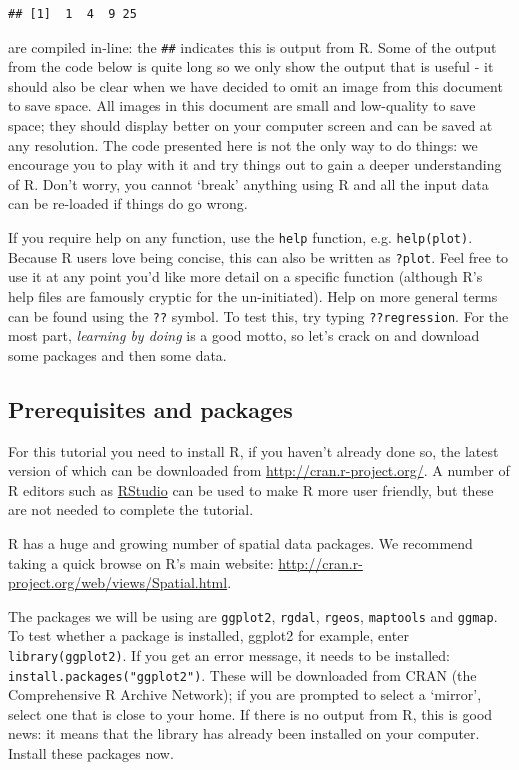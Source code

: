 \documentclass[]{article}
\begin{document}
\begin{verbatim}
## [1]  1  4  9 25
\end{verbatim}

are compiled in-line: the \texttt{\#\#} indicates this is output from R.
Some of the output from the code below is quite long so we only show the
output that is useful - it should also be clear when we have decided to
omit an image from this document to save space. All images in this
document are small and low-quality to save space; they should display
better on your computer screen and can be saved at any resolution. The
code presented here is not the only way to do things: we encourage you
to play with it and try things out to gain a deeper understanding of R.
Don't worry, you cannot `break' anything using R and all the input data
can be re-loaded if things do go wrong.

If you require help on any function, use the \texttt{help} function,
e.g. \texttt{help(plot)}. Because R users love being concise, this can
also be written as \texttt{?plot}. Feel free to use it at any point
you'd like more detail on a specific function (although R's help files
are famously cryptic for the un-initiated). Help on more general terms
can be found using the \texttt{??} symbol. To test this, try typing
\texttt{??regression}. For the most part, \emph{learning by doing} is a
good motto, so let's crack on and download some packages and then some
data.

\subsection{Prerequisites and
packages}\label{prerequisites-and-packages}

For this tutorial you need to install R, if you haven't already done so,
the latest version of which can be downloaded from
\url{http://cran.r-project.org/}. A number of R editors such as
\href{http://www.rstudio.com/}{RStudio} can be used to make R more user
friendly, but these are not needed to complete the tutorial.

R has a huge and growing number of spatial data packages. We recommend
taking a quick browse on R's main website:
\url{http://cran.r-project.org/web/views/Spatial.html}.

The packages we will be using are \texttt{ggplot2}, \texttt{rgdal},
\texttt{rgeos}, \texttt{maptools} and \texttt{ggmap}. To test whether a
package is installed, ggplot2 for example, enter
\texttt{library(ggplot2)}. If you get an error message, it needs to be
installed: \texttt{install.packages("ggplot2")}. These will be
downloaded from CRAN (the Comprehensive R Archive Network); if you are
prompted to select a `mirror', select one that is close to your home. If
there is no output from R, this is good news: it means that the library
has already been installed on your computer. Install these packages now.
\end{document}
